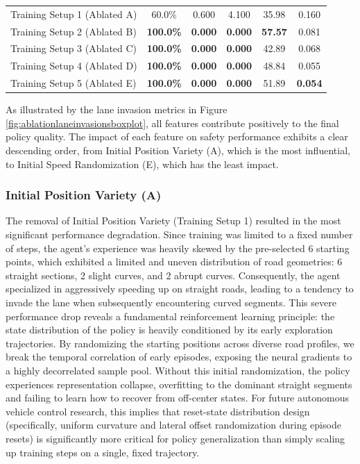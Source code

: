 \documentclass[sn-mathphys,Numbered]{sn-jnl}
\begin{document}
\begin{table}[htbp]
\begin{tabular}{lccccc}
\quad Training Setup 1 (Ablated A) & 60.0\% & 0.600 & 4.100 & 35.98 & 0.160 \\
\quad Training Setup 2 (Ablated B) & \textbf{100.0\%} & \textbf{0.000} & \textbf{0.000} & \textbf{57.57} & 0.081 \\
\quad Training Setup 3 (Ablated C) & \textbf{100.0\%} & \textbf{0.000} & \textbf{0.000} & 42.89 & 0.068 \\
\quad Training Setup 4 (Ablated D) & \textbf{100.0\%} & \textbf{0.000} & \textbf{0.000} & 48.84 & 0.055 \\
\quad Training Setup 5 (Ablated E) & \textbf{100.0\%} & \textbf{0.000} & \textbf{0.000} & 51.89 & \textbf{0.054} \\
\hline
\end{tabular}
\end{table}

As illustrated by the lane invasion metrics in Figure \ref{fig:ablationlaneinvasionsboxplot}, all features contribute positively to the final policy quality. The impact of each feature on safety performance exhibits a clear descending order, from Initial Position Variety (A), which is the most influential, to Initial Speed Randomization (E), which has the least impact.

\subsubsection{Initial Position Variety (A)}
The removal of Initial Position Variety (Training Setup 1) resulted in the most significant performance degradation. Since training was limited to a fixed number of steps, the agent's experience was heavily skewed by the pre-selected 6 starting points, which exhibited a limited and uneven distribution of road geometries: 6 straight sections, 2 slight curves, and 2 abrupt curves. Consequently, the agent specialized in aggressively speeding up on straight roads, leading to a tendency to invade the lane when subsequently encountering curved segments. This severe performance drop reveals a fundamental reinforcement learning principle: the state distribution of the policy is heavily conditioned by its early exploration trajectories. By randomizing the starting positions across diverse road profiles, we break the temporal correlation of early episodes, exposing the neural gradients to a highly decorrelated sample pool. Without this initial randomization, the policy experiences representation collapse, overfitting to the dominant straight segments and failing to learn how to recover from off-center states. For future autonomous vehicle control research, this implies that reset-state distribution design (specifically, uniform curvature and lateral offset randomization during episode resets) is significantly more critical for policy generalization than simply scaling up training steps on a single, fixed trajectory.
\end{document}
